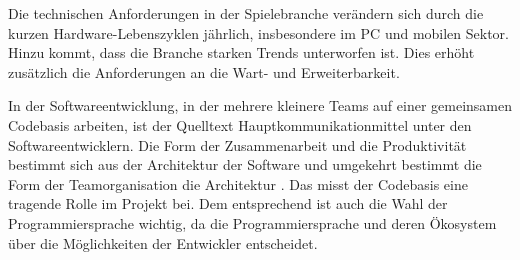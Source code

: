 Die technischen Anforderungen in der Spielebranche verändern sich durch die kurzen Hardware-Lebenszyklen jährlich, insbesondere im PC und mobilen Sektor. Hinzu kommt, dass die Branche starken Trends unterworfen ist. Dies erhöht zusätzlich die Anforderungen an die Wart- und Erweiterbarkeit.

In der Softwareentwicklung, in der mehrere kleinere Teams auf einer gemeinsamen Codebasis arbeiten, ist der Quelltext Hauptkommunikationmittel unter den Softwareentwicklern. Die Form der Zusammenarbeit und die Produktivität bestimmt sich aus der Architektur der Software und umgekehrt bestimmt die Form der Teamorganisation die Architektur \parencite[Foreword, Seite xix u. Kapitel 1, Seite 13f]{Martin2008}. Das misst der Codebasis eine tragende Rolle im Projekt bei. Dem entsprechend ist auch die Wahl der Programmiersprache wichtig, da die Programmiersprache und deren Ökosystem über die Möglichkeiten der Entwickler entscheidet.





